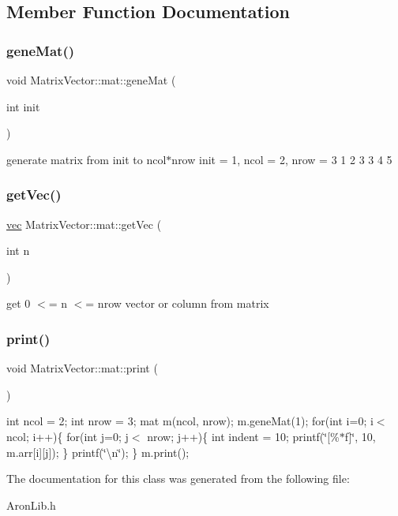 \subsection{Member Function Documentation}
\mbox{\label{class_matrix_vector_1_1mat_a8906d4f0766b3bdac3a45e565ce92616}} 
\subsubsection{\texorpdfstring{gene\+Mat()}{geneMat()}}
{\footnotesize\ttfamily void Matrix\+Vector\+::mat\+::gene\+Mat (\begin{DoxyParamCaption}\item[{int}]{init }\end{DoxyParamCaption})}

generate matrix from init to ncol$\ast$nrow init = 1, ncol = 2, nrow = 3 1 2 3 3 4 5 \mbox{\label{class_matrix_vector_1_1mat_af971b3b347cdb13e134824d386d2b605}} 
\subsubsection{\texorpdfstring{get\+Vec()}{getVec()}}
{\footnotesize\ttfamily \mbox{\hyperlink{class_matrix_vector_1_1vec}{vec}} Matrix\+Vector\+::mat\+::get\+Vec (\begin{DoxyParamCaption}\item[{int}]{n }\end{DoxyParamCaption})}

get 0 $<$= n $<$= nrow vector or column from matrix \mbox{\label{class_matrix_vector_1_1mat_ae18b1579a3eaef088178cff21f3d6a34}} 
\subsubsection{\texorpdfstring{print()}{print()}}
{\footnotesize\ttfamily void Matrix\+Vector\+::mat\+::print (\begin{DoxyParamCaption}{ }\end{DoxyParamCaption})}

int ncol = 2; int nrow = 3; mat m(ncol, nrow); m.\+gene\+Mat(1); for(int i=0; i$<$ ncol; i++)\{ for(int j=0; j$<$ nrow; j++)\{ int indent = 10; printf(\char`\"{}\mbox{[}\%$\ast$f\mbox{]}\char`\"{}, 10, m.\+arr\mbox{[}i\mbox{]}\mbox{[}j\mbox{]}); \} printf(\char`\"{}\textbackslash{}n\char`\"{}); \} m.\+print(); 

The documentation for this class was generated from the following file\+:\begin{DoxyCompactItemize}
\item 
Aron\+Lib.\+h\end{DoxyCompactItemize}
